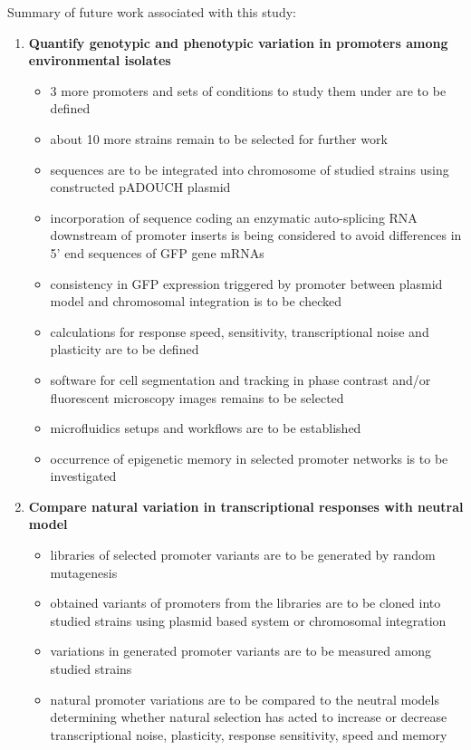 Summary of future work associated with this study:

\begin{enumerate}

	\item \textbf{Quantify genotypic and phenotypic variation in promoters among environmental  isolates}
	
	\begin{itemize}
	
		\item 3 more promoters and sets of conditions to study them under are to be defined
		\item about 10 more strains remain to be selected for further work
		\item {} sequences are to be integrated into chromosome of studied strains using constructed pADOUCH plasmid
		\item incorporation of sequence coding an enzymatic auto-splicing RNA downstream of promoter inserts is being considered to avoid differences in 5' end sequences of GFP gene mRNAs
		\item consistency in GFP expression triggered by  promoter between plasmid model and chromosomal integration is to be checked
		\item calculations for response speed, sensitivity, transcriptional noise and plasticity are to be defined
		\item software for cell segmentation and tracking in phase contrast and/or fluorescent microscopy images remains to be selected
		\item microfluidics setups and workflows are to be established
		\item occurrence of epigenetic memory in selected promoter networks is to be investigated
			
	\end{itemize}
	
	\item \textbf{Compare natural variation in transcriptional responses with neutral model}
	
	\begin{itemize}
	
		\item libraries of selected promoter variants are to be generated by random mutagenesis
		\item obtained variants of promoters from the libraries are to be cloned into studied strains using plasmid based system or chromosomal integration
		\item variations in generated promoter variants are to be measured among studied strains
		\item natural promoter variations are to be compared to the neutral models determining whether natural selection has acted to increase or decrease transcriptional noise, plasticity, response sensitivity, speed and memory
	
	\end{itemize}

\end{enumerate}

\cleardoublepage%

\shorthandon{-}


